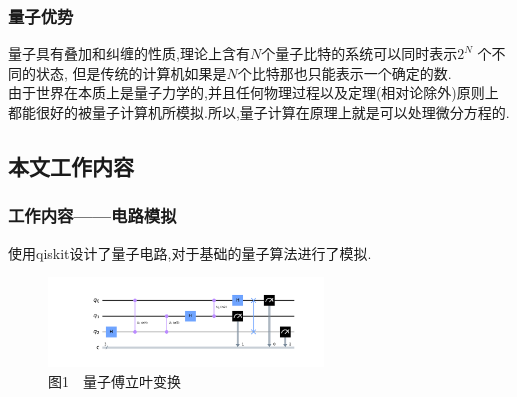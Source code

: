\documentclass{beamer}
\begin{document}
\begin{spacing}{1.2}
{    \begin{frame}
    	\frametitle{量子优势}
    	量子具有叠加和纠缠的性质,理论上含有$N$个量子比特的系统可以同时表示$2^N$
    	个不同的状态, 但是传统的计算机如果是$N$个比特那也只能表示一个确定的数.\\
    	由于世界在本质上是量子力学的,并且任何物理过程以及定理(相对论除外)原则上都能很好的被量子计算机所模拟.所以,量子计算在原理上就是可以处理微分方程的.
 \end{frame}

\subsection{本文工作内容}
  \begin{frame}
  	  \frametitle{工作内容——电路模拟}
         使用qiskit设计了量子电路,对于基础的量子算法进行了模拟.
        \begin{figure}
        	\centering
        	\vspace{-0.2cm}
        	\includegraphics[width=0.65\textwidth]{qft.pdf}
        	\caption{图1~~量子傅立叶变换}
       

\end{figure}
\end{frame}}
\end{spacing}
\end{document}
